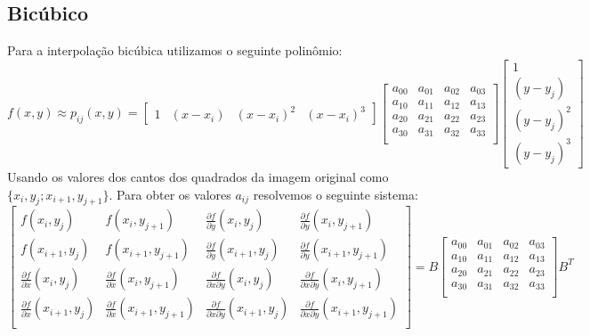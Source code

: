 \documentclass[12pt, a4paper]{article}
\begin{document}
\subsection*{Bicúbico}
    Para a interpolação bicúbica utilizamos o seguinte polinômio:
    \begin{equation*}
        f(x,y) \approx p_{ij}(x,y) =
        \begin{bmatrix}
            1 & (x - x_{i}) & (x - x_{i})^2 & (x - x_{i})^3
        \end{bmatrix}
        \begin{bmatrix}
            a_{00} & a_{01} & a_{02} & a_{03} \\
            a_{10} & a_{11} & a_{12} & a_{13} \\
            a_{20} & a_{21} & a_{22} & a_{23} \\
            a_{30} & a_{31} & a_{32} & a_{33} \\
        \end{bmatrix}
        \begin{bmatrix}
            1 \\
            (y - y_{j}) \\
            (y - y_{j})^2 \\
            (y - y_{j})^3
        \end{bmatrix}
    \end{equation*}
    Usando os valores dos cantos dos quadrados da imagem original como
    $\{x_i, y_j; x_{i+1}, y_{j+1}\}$. Para obter os valores $a_{ij}$ resolvemos
    o seguinte sistema:
    \begin{equation*}
        \begin{bmatrix}
            f(x_{i},y_{j})                               & f(x_{i},y_{j+1})                               & \frac{\partial f}{\partial y}(x_{i},y_{j})              & \frac{\partial f}{\partial y}(x_{i},y_{j+1}) \\
            f(x_{i+1},y_{j})                             & f(x_{i+1},y_{j+1})                             & \frac{\partial f}{\partial y}(x_{i+1},y_{j})            & \frac{\partial f}{\partial y}(x_{i+1},y_{j+1}) \\
            \frac{\partial f}{\partial x}(x_{i},y_{j})   & \frac{\partial f}{\partial x}(x_{i},y_{j+1})   & \frac{\partial f}{\partial x \partial y}(x_{i},y_{j})   & \frac{\partial f}{\partial x \partial y}(x_{i},y_{j+1}) \\
            \frac{\partial f}{\partial x}(x_{i+1},y_{j}) & \frac{\partial f}{\partial x}(x_{i+1},y_{j+1}) & \frac{\partial f}{\partial x \partial y}(x_{i+1},y_{j}) & \frac{\partial f}{\partial x \partial y}(x_{i+1},y_{j+1}) \\
        \end{bmatrix} =
        B
        \begin{bmatrix}
            a_{00} & a_{01} & a_{02} & a_{03} \\
            a_{10} & a_{11} & a_{12} & a_{13} \\
            a_{20} & a_{21} & a_{22} & a_{23} \\
            a_{30} & a_{31} & a_{32} & a_{33} \\
        \end{bmatrix}
        B^T
    \end{equation*}
\end{document}
